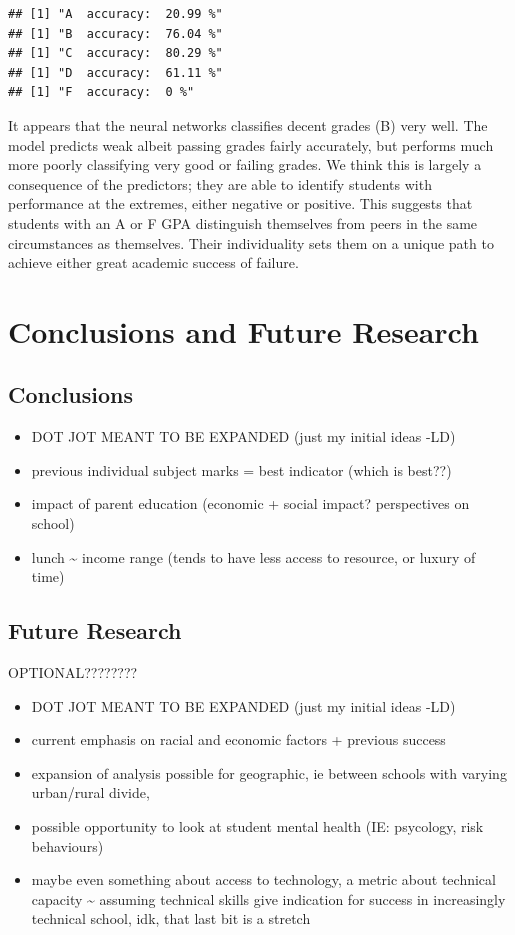 \documentclass[
]{article}
\providecommand{\tightlist}{%
  \setlength{\itemsep}{0pt}\setlength{\parskip}{0pt}}
\begin{document}
\begin{verbatim}
## [1] "A  accuracy:  20.99 %"
## [1] "B  accuracy:  76.04 %"
## [1] "C  accuracy:  80.29 %"
## [1] "D  accuracy:  61.11 %"
## [1] "F  accuracy:  0 %"
\end{verbatim}

It appears that the neural networks classifies decent grades (B) very
well. The model predicts weak albeit passing grades fairly accurately,
but performs much more poorly classifying very good or failing grades.
We think this is largely a consequence of the predictors; they are able
to identify students with performance at the extremes, either negative
or positive. This suggests that students with an A or F GPA distinguish
themselves from peers in the same circumstances as themselves. Their
individuality sets them on a unique path to achieve either great
academic success of failure.

\section{Conclusions and Future
Research}\label{conclusions-and-future-research}

\subsection{Conclusions}\label{conclusions}

\begin{itemize}
\tightlist
\item
  DOT JOT MEANT TO BE EXPANDED (just my initial ideas -LD)
\item
  previous individual subject marks = best indicator (which is best??)
\item
  impact of parent education (economic + social impact? perspectives on
  school)
\item
  lunch \textasciitilde{} income range (tends to have less access to
  resource, or luxury of time)
\end{itemize}

\subsection{Future Research}\label{future-research}

OPTIONAL????????

\begin{itemize}
\tightlist
\item
  DOT JOT MEANT TO BE EXPANDED (just my initial ideas -LD)
\item
  current emphasis on racial and economic factors + previous success
\item
  expansion of analysis possible for geographic, ie between schools with
  varying urban/rural divide,
\item
  possible opportunity to look at student mental health (IE: psycology,
  risk behaviours)
\item
  maybe even something about access to technology, a metric about
  technical capacity \textasciitilde{} assuming technical skills give
  indication for success in increasingly technical school, idk, that
  last bit is a stretch
\end{itemize}
\end{document}
